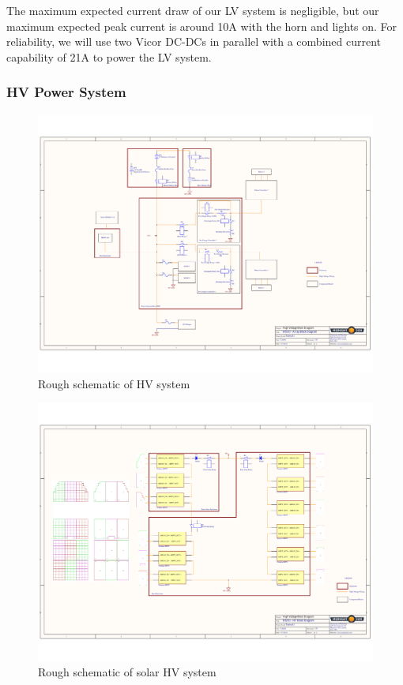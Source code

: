 \documentclass[10pt]{article}
\begin{document}
The maximum expected current draw of our LV system is negligible, but our maximum expected peak current is around 10A with the horn and lights on. For reliability, we will use two Vicor DC-DCs in parallel with a combined current capability of 21A to power the LV system.

\subsubsection{HV Power System}

\begin{figure}[H]
    \centering
    \includegraphics[width=\textwidth]{figures/hv-block-diagram}
    \caption{Rough schematic of HV system}
    \label{fig:msxii-electrical-hv-system}
\end{figure}

\begin{figure}[H]
    \centering
    \includegraphics[width=\textwidth]{figures/solar-block-diagram}
    \caption{Rough schematic of solar HV system}
    \label{fig:msxii-electrical-solar-system}
\end{figure}
\end{document}
